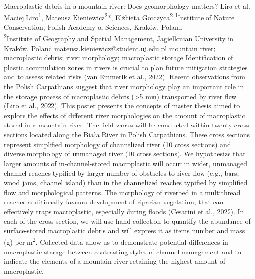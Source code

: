 \abstract
{Macroplastic debris in a mountain river: Does geomorphology matters?} 
{Liro et al.} 
{Maciej Liro\textsuperscript{1}, Mateusz Kieniewicz\textsuperscript{2}*, Elżbieta Gorczyca\textsuperscript{2}} 
{\POtag} 
{
\textsuperscript{1}Institute of Nature Conservation, Polish Academy of Sciences, Kraków, Poland\\
\textsuperscript{2}Institute of Geography and Spatial Management, Jagiellonian University in Kraków, Poland
}
{mateusz.kieniewicz@student.uj.edu.pl}  %
{mountain river; macroplastic debris; river morphology; macroplastic storage }
{Identification of plastic accumulation zones in rivers is crucial to plan future mitigation strategies and to assess related risks (van Emmerik et al., 2022). Recent observations from the Polish Carpathians suggest that river morphology play an important role in the storage process of macroplastic debris (>5 mm) transported by river flow (Liro et al., 2022). This poster presents the concepts of master thesis aimed to explore the effects of different river morphologies on the amount of macroplastic stored in a mountain river. The field works will be conducted within twenty cross sections located along the Biała River in Polish Carpathians. These cross sections represent simplified morphology of channelized river (10 cross sections) and diverse morphology of unmanaged river (10 cross sections). We hypothesize that larger amounts of in-channel-stored macroplastic will occur in wider, unmanaged channel reaches typified by larger number of obstacles to river flow (e.g., bars, wood jams, channel island) than in the channelized reaches typified by simplified flow and morphological patterns. The morphology of riverbed in a multithread reaches additionally favours development of riparian vegetation, that can effectively traps macroplastic, especially during floods (Cesarini et al., 2022). In each of the cross-section, we will use hand collection to quantify the abundance of surface-stored macroplastic debris and will express it as items number and mass (g) per m\textsuperscript{2}. Collected data allow us to demonstrate potential differences in macroplastic storage between contrasting styles of channel management and to indicate the elements of a mountain river retaining the highest amount of macroplastic.
}
